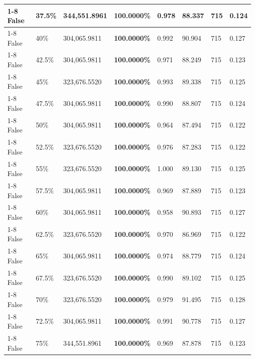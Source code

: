 \begin{table}[H]
\begin{tabular}{lllrllll}
\cline{1-8} \cline{2-8}
False & 37.5\% & 344,551.8961 & \bfseries \color{red} 100.0000\% & 0.978 & 88.337 & 715 & 0.124 \\
\cline{1-8} \cline{2-8}
False & 40\% & \color{red} 304,065.9811 & \bfseries \color{red} 100.0000\% & 0.992 & 90.904 & 715 & 0.127 \\
\cline{1-8} \cline{2-8}
False & 42.5\% & \color{red} 304,065.9811 & \bfseries \color{red} 100.0000\% & 0.971 & 88.249 & 715 & 0.123 \\
\cline{1-8} \cline{2-8}
False & 45\% & 323,676.5520 & \bfseries \color{red} 100.0000\% & 0.993 & 89.338 & 715 & 0.125 \\
\cline{1-8} \cline{2-8}
False & 47.5\% & \color{red} 304,065.9811 & \bfseries \color{red} 100.0000\% & 0.990 & 88.807 & 715 & 0.124 \\
\cline{1-8} \cline{2-8}
False & 50\% & \color{red} 304,065.9811 & \bfseries \color{red} 100.0000\% & 0.964 & 87.494 & 715 & 0.122 \\
\cline{1-8} \cline{2-8}
False & 52.5\% & 323,676.5520 & \bfseries \color{red} 100.0000\% & 0.976 & 87.283 & 715 & 0.122 \\
\cline{1-8} \cline{2-8}
False & 55\% & 323,676.5520 & \bfseries \color{red} 100.0000\% & 1.000 & 89.130 & 715 & 0.125 \\
\cline{1-8} \cline{2-8}
False & 57.5\% & \color{red} 304,065.9811 & \bfseries \color{red} 100.0000\% & 0.969 & 87.889 & 715 & 0.123 \\
\cline{1-8} \cline{2-8}
False & 60\% & \color{red} 304,065.9811 & \bfseries \color{red} 100.0000\% & 0.958 & 90.893 & 715 & 0.127 \\
\cline{1-8} \cline{2-8}
False & 62.5\% & 323,676.5520 & \bfseries \color{red} 100.0000\% & 0.970 & 86.969 & 715 & 0.122 \\
\cline{1-8} \cline{2-8}
False & 65\% & \color{red} 304,065.9811 & \bfseries \color{red} 100.0000\% & 0.974 & 88.779 & 715 & 0.124 \\
\cline{1-8} \cline{2-8}
False & 67.5\% & 323,676.5520 & \bfseries \color{red} 100.0000\% & 0.990 & 89.102 & 715 & 0.125 \\
\cline{1-8} \cline{2-8}
False & 70\% & 323,676.5520 & \bfseries \color{red} 100.0000\% & 0.979 & 91.495 & 715 & 0.128 \\
\cline{1-8} \cline{2-8}
False & 72.5\% & \color{red} 304,065.9811 & \bfseries \color{red} 100.0000\% & 0.991 & 90.778 & 715 & 0.127 \\
\cline{1-8} \cline{2-8}
False & 75\% & 344,551.8961 & \bfseries \color{red} 100.0000\% & 0.969 & 87.878 & 715 & 0.123 \\

\end{tabular}
\end{table}
